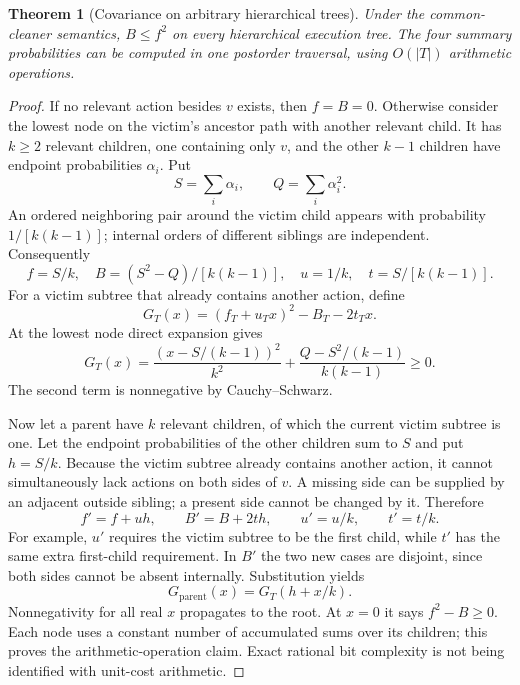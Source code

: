 \documentclass[11pt,a4paper]{article}
\newtheorem{theorem}{Theorem}[section]
\theoremstyle{definition}\newtheorem{definition}[theorem]{Definition}
\theoremstyle{remark}\newtheorem{remark}[theorem]{Remark}
\theoremstyle{definition}\newtheorem{xexample}[xtheorem]{Example}\theoremstyle{plain}
\begin{document}
\begin{theorem}[Covariance on arbitrary hierarchical trees]\label{thm:cov}
Under the common-cleaner semantics, $B\le f^2$ on every hierarchical execution tree. The four summary probabilities can be computed in one postorder traversal, using $O(|T|)$ arithmetic operations.
\end{theorem}
\begin{proof}
If no relevant action besides $v$ exists, then $f=B=0$. Otherwise consider the lowest node on the victim's ancestor path with another relevant child. It has $k\ge2$ relevant children, one containing only $v$, and the other $k-1$ children have endpoint probabilities $\alpha_i$. Put
\[
 S=\sum_i\alpha_i,\qquad Q=\sum_i\alpha_i^2.
\]
An ordered neighboring pair around the victim child appears with probability $1/[k(k-1)]$; internal orders of different siblings are independent. Consequently
\begin{equation}\label{eq:base}
 f=S/k,\quad B=(S^2-Q)/[k(k-1)],\quad
 u=1/k,\quad t=S/[k(k-1)].
\end{equation}
For a victim subtree that already contains another action, define
\[
 G_T(x)=(f_T+u_Tx)^2-B_T-2t_Tx.
\]
At the lowest node direct expansion gives
\begin{equation}\label{eq:sos}
 G_T(x)=\frac{(x-S/(k-1))^2}{k^2}
       +\frac{Q-S^2/(k-1)}{k(k-1)}\ge0.
\end{equation}
The second term is nonnegative by Cauchy--Schwarz.

Now let a parent have $k$ relevant children, of which the current victim subtree is one. Let the endpoint probabilities of the other children sum to $S$ and put $h=S/k$. Because the victim subtree already contains another action, it cannot simultaneously lack actions on both sides of $v$. A missing side can be supplied by an adjacent outside sibling; a present side cannot be changed by it. Therefore
\begin{equation}\label{eq:rec}
 f'=f+uh,\qquad B'=B+2th,\qquad u'=u/k,\qquad t'=t/k.
\end{equation}
For example, $u'$ requires the victim subtree to be the first child, while $t'$ has the same extra first-child requirement. In $B'$ the two new cases are disjoint, since both sides cannot be absent internally. Substitution yields
\[
 G_{\mathrm{parent}}(x)=G_T(h+x/k).
\]
Nonnegativity for all real $x$ propagates to the root. At $x=0$ it says $f^2-B\ge0$. Each node uses a constant number of accumulated sums over its children; this proves the arithmetic-operation claim. Exact rational bit complexity is not being identified with unit-cost arithmetic.
\end{proof}
\end{document}
